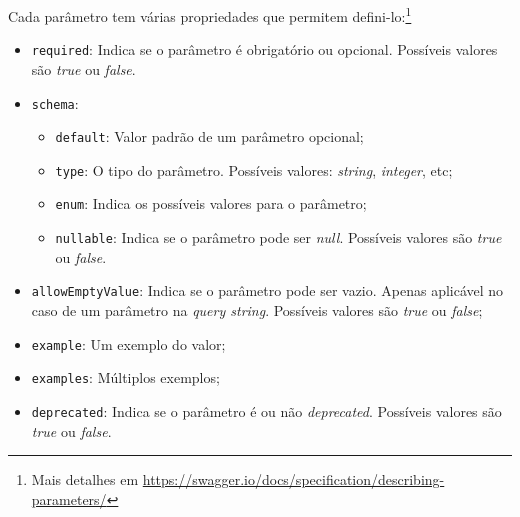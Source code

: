 Cada parâmetro tem várias propriedades que permitem defini-lo:\footnote{Mais detalhes em \url{https://swagger.io/docs/specification/describing-parameters/}}
\begin{itemize}
    \item \texttt{required}: Indica se o parâmetro é obrigatório ou opcional. 
    Possíveis valores são \textit{true} ou \textit{false}.
    \item \texttt{schema}:
    \begin{itemize}
        \item \texttt{default}: Valor padrão de um parâmetro opcional;
        \item \texttt{type}: O tipo do parâmetro. Possíveis valores: \textit{string}, \textit{integer}, etc;
        \item \texttt{enum}: Indica os possíveis valores para o parâmetro;
        \item \texttt{nullable}: Indica se o parâmetro pode ser \textit{null}. Possíveis valores são 
        \textit{true} ou \textit{false}.
    \end{itemize}
    \item \texttt{allowEmptyValue}: Indica se o parâmetro pode ser vazio. Apenas aplicável no caso de um 
    parâmetro na \textit{query string}. Possíveis valores são \textit{true} ou \textit{false};
    \item \texttt{example}: Um exemplo do valor;
    \item \texttt{examples}: Múltiplos exemplos;
    \item \texttt{deprecated}: Indica se o parâmetro é ou não \textit{deprecated}. Possíveis valores são 
    \textit{true} ou \textit{false}.
\end{itemize}

